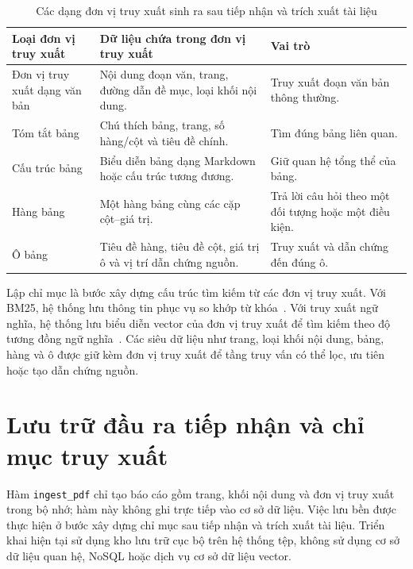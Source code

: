 \documentclass[../DoAn.tex]{subfiles}
\begin{document}
\begin{table}[H]
\centering
\small
\renewcommand{\arraystretch}{1.2}
\caption{Các dạng đơn vị truy xuất sinh ra sau tiếp nhận và trích xuất tài liệu}
\label{tab:ingest-chunk-types}
\begin{tabularx}{\textwidth}{
    |>{\raggedright\arraybackslash}p{}
    |>{\raggedright\arraybackslash}X
    |>{\raggedright\arraybackslash}p{}|
}
\hline
\textbf{Loại đơn vị truy xuất} & \textbf{Dữ liệu chứa trong đơn vị truy xuất} & \textbf{Vai trò} \\
\hline
Đơn vị truy xuất dạng văn bản  &
Nội dung đoạn văn, trang, đường dẫn đề mục, loại khối nội dung. &
Truy xuất đoạn văn bản thông thường. \\
\hline
Tóm tắt bảng &
Chú thích bảng, trang, số hàng/cột và tiêu đề chính. &
Tìm đúng bảng liên quan. \\
\hline
Cấu trúc bảng &
Biểu diễn bảng dạng Markdown hoặc cấu trúc tương đương. &
Giữ quan hệ tổng thể của bảng. \\
\hline
Hàng bảng &
Một hàng bảng cùng các cặp cột--giá trị. &
Trả lời câu hỏi theo một đối tượng hoặc một điều kiện. \\
\hline
Ô bảng &
Tiêu đề hàng, tiêu đề cột, giá trị ô và vị trí dẫn chứng nguồn. &
Truy xuất và dẫn chứng đến đúng ô. \\
\hline
\end{tabularx}
\end{table}

Lập chỉ mục là bước xây dựng cấu trúc tìm kiếm từ các đơn vị truy xuất. Với BM25, hệ thống
lưu thông tin phục vụ so khớp từ khóa~\cite{robertson2009bm25}. Với
truy xuất ngữ nghĩa, hệ thống lưu biểu diễn vector của đơn vị truy xuất để tìm kiếm theo độ tương đồng ngữ
nghĩa~\cite{karpukhin2020dpr,reimers2019sentencebert}. Các siêu dữ liệu như trang,
loại khối nội dung, bảng, hàng và ô được giữ kèm đơn vị truy xuất để tầng truy vấn có thể lọc, ưu
tiên hoặc tạo dẫn chứng nguồn.

\section{Lưu trữ đầu ra tiếp nhận và chỉ mục truy xuất}
\label{section:ingest-storage-index}

Hàm \texttt{ingest\_pdf} chỉ tạo báo cáo gồm trang, khối nội dung và đơn vị truy
xuất trong bộ nhớ; hàm này không ghi trực tiếp vào cơ sở dữ liệu. Việc lưu bền được
thực hiện ở bước xây dựng chỉ mục sau tiếp nhận và trích xuất tài liệu. Triển khai
hiện tại sử dụng kho lưu trữ cục bộ trên hệ thống tệp, không sử dụng cơ sở dữ liệu
quan hệ, NoSQL hoặc dịch vụ cơ sở dữ liệu vector.
\end{document}
